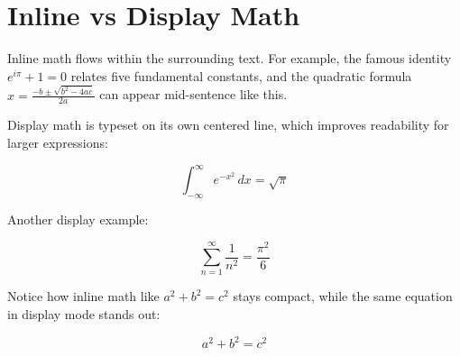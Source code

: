 \documentclass[12pt, a4paper]{article}
\begin{document}
\section*{Inline vs Display Math}

Inline math flows within the surrounding text. For example, the famous
identity \( e^{i\pi} + 1 = 0 \) relates five fundamental constants, and
the quadratic formula \( x = \frac{-b \pm \sqrt{b^2 - 4ac}}{2a} \) can
appear mid-sentence like this.

Display math is typeset on its own centered line, which improves
readability for larger expressions:

\[
  \int_{-\infty}^{\infty} e^{-x^2}\,dx = \sqrt{\pi}
\]

Another display example:

\[
  \sum_{n=1}^{\infty} \frac{1}{n^2} = \frac{\pi^2}{6}
\]

Notice how inline math like \( a^2 + b^2 = c^2 \) stays compact, while
the same equation in display mode stands out:

\[
  a^2 + b^2 = c^2
\]
\end{document}
